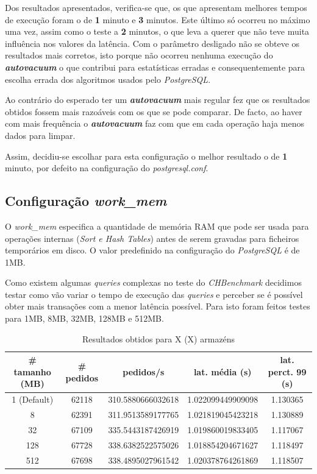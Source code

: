 Dos resultados apresentados, verifica-se que, os que apresentam melhores tempos de execução foram o de \textbf{1} minuto e \textbf{3} minutos. Este último só ocorreu no máximo uma vez, assim como o teste a \textbf{2} minutos, o que leva a querer que não teve muita influência nos valores da latência. Com o parâmetro desligado não se obteve os resultados mais corretos, isto porque não ocorreu nenhuma execução do \textit{\textbf{autovacuum}} o que contribui para estatísticas erradas e consequentemente para escolha errada dos algoritmos usados pelo \textit{PostgreSQL}.

Ao contrário do esperado ter um \textit{\textbf{autovacuum}} mais regular fez que os resultados obtidos fossem mais razoáveis com os que se pode comparar. De facto, ao haver com mais frequência o \textit{\textbf{autovacuum}} faz com que em cada operação haja menos dados para limpar.

Assim, decidiu-se escolhar para esta configuração o melhor resultado o de \textbf{1} minuto, por defeito na configuração do \textit{postgresql.conf}.

\newpage

\subsection{Configuração \textit{work\_mem}}

O \textit{work\_mem} especifica a quantidade de memória RAM que pode ser usada para operações internas (\textit{Sort e Hash Tables}) antes de serem gravadas para ficheiros temporários em disco. O valor predefinido na configuração do \textit{PostgreSQL} é de 1MB.

Como existem algumas \textit{queries} complexas no teste do \textit{CHBenchmark} decidimos testar como vão variar o tempo de execução das \textit{queries} e perceber se é possível obter mais transações com a menor latência possível. Para isto foram feitos testes para 1MB, 8MB, 32MB, 128MB e 512MB.

\begin{table}[!h]
\center
\small
\begin{tabular}{|c|c|c|c|c|}
\hline
\textbf{\# tamanho (MB)} & \textbf{\# pedidos} & \textbf{pedidos/s} & \textbf{lat. média (s)} & \textbf{lat. perct. 99 (s)}  \\ \hline
1 (Default) & 62118 & 310.5880666032618 & 1.022099449909098 & 1.130365  \\ \hline
8 & 62391 & 311.9513589177765 & 1.021819045423218 & 1.130889  \\ \hline
32 & 67109 & 335.5443187426919 & 1.019860019833405 & 1.117067  \\ \hline
128 & 67728 & 338.6382522575026 & 1.018854204671627 & 1.118497  \\ \hline
512 & 67698 & 338.4895027961542 & 1.020378764261869 & 1.118507  \\ \hline
\end{tabular}
\caption{Resultados obtidos para X (X) armazéns}
\end{table}

